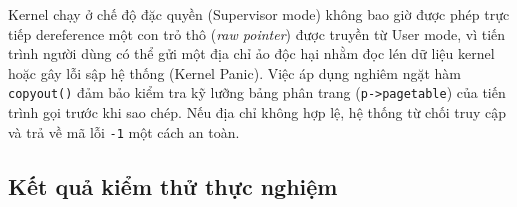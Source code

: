 \begin{calloutwarning}
    Kernel chạy ở chế độ đặc quyền (Supervisor mode) không bao giờ được phép trực tiếp dereference một con trỏ thô (\textit{raw pointer}) được truyền từ User mode, vì tiến trình người dùng có thể gửi một địa chỉ ảo độc hại nhằm đọc lén dữ liệu kernel hoặc gây lỗi sập hệ thống (Kernel Panic). Việc áp dụng nghiêm ngặt hàm \texttt{copyout()} đảm bảo kiểm tra kỹ lưỡng bảng phân trang (\texttt{p->pagetable}) của tiến trình gọi trước khi sao chép. Nếu địa chỉ không hợp lệ, hệ thống từ chối truy cập và trả về mã lỗi \texttt{-1} một cách an toàn.
\end{calloutwarning}

\subsection{Kết quả kiểm thử thực nghiệm}

